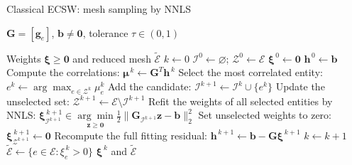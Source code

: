 \documentclass[aspectratio=169]{beamer}
\newif\ifbmecswalgorithm
\newcommand{\vect}[1]{\boldsymbol{#1}}
\newcommand{\matr}[1]{\boldsymbol{#1}}
\newcommand{\ECSWLinkedLineNumber}[1]{%
  \hyperlink{ecsw-line-#1}{\textcolor{stanfordred}{#1:}}%
}
\begin{document}
\bmecswalgorithmtrue
\begin{frame}[t]{Classical ECSW: mesh sampling by NNLS}
\fontsize{7.5}{8.2}\selectfont
\let\alglinenumber\ECSWLinkedLineNumber
\begin{algorithmic}[1]
  \setlength{\itemsep}{0pt}
  \Require \hypertarget{ecsw-classical-algorithm}{%
    $\matr{G}=[\vect{g}_e]$, $\vect{b}\neq\vect{0}$, tolerance $\tau\in(0,1)$}
  \Ensure Weights $\vect{\xi}\geq\vect{0}$ and reduced mesh $\widetilde{\mathcal E}$
  \State $k\gets0$
  \State $\mathcal I^0\gets\varnothing$; $\mathcal Z^0\gets\mathcal E$
  \State $\vect{\xi}^{\,0}\gets\vect{0}$
  \State $\vect{h}^{\,0}\gets\vect{b}$
  \While{$\|\vect{h}^{\,k}\|_2>\tau\|\vect{b}\|_2$}
    \State Compute the correlations: $\vect{\mu}^{\,k}\gets\matr{G}^T\vect{h}^{\,k}$
    \State Select the most correlated entity: $e^k\gets\arg\max_{e\in\mathcal Z^k}\mu_e^k$
    \State Add the candidate: $\mathcal I^{k+1}\gets\mathcal I^k\cup\{e^k\}$
    \State Update the unselected set: $\mathcal Z^{k+1}\gets\mathcal E\setminus\mathcal I^{k+1}$
    \State Refit the weights of all selected entities by NNLS:
    \Statex \hspace{\algorithmicindent}$\displaystyle
      \vect{\xi}^{\,k+1}_{\mathcal I^{k+1}}\in
      \underset{\vect{z}\geq\vect{0}}{\arg\min}
      \frac12\|\matr{G}_{\mathcal I^{k+1}}\vect{z}-\vect{b}\|_2^2$
    \State Set unselected weights to zero: $\vect{\xi}^{\,k+1}_{\mathcal Z^{k+1}}\gets\vect{0}$
    \State Recompute the full fitting residual: $\vect{h}^{\,k+1}\gets\vect{b}-\matr{G}\vect{\xi}^{\,k+1}$
    \State $k\gets k+1$
  \EndWhile
  \State $\widetilde{\mathcal E}\gets\{e\in\mathcal E:\xi_e^{\,k}>0\}$
  \State \Return $\vect{\xi}^{\,k}$ and $\widetilde{\mathcal E}$
\end{algorithmic}
\end{frame}
\bmecswalgorithmfalse
\end{document}

